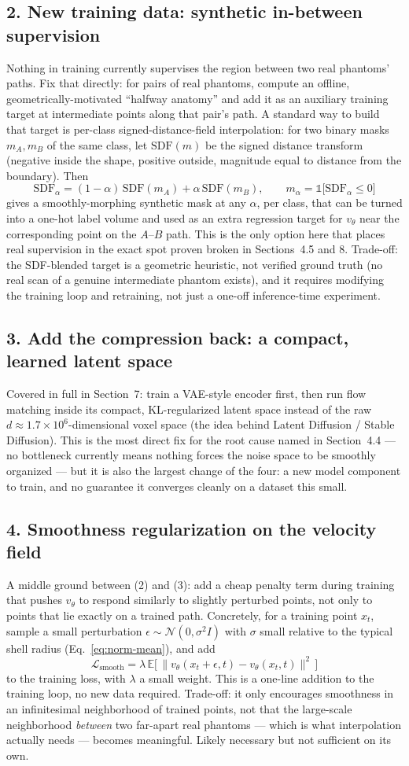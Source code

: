 \documentclass[11pt]{article}
\newcommand{\hsub}[1]{\subsection*{#1}}
\begin{document}
\hsub{2. New training data: synthetic in-between supervision}
Nothing in training currently supervises the region between two real phantoms' paths. Fix
that directly: for pairs of real phantoms, compute an offline, geometrically-motivated
``halfway anatomy'' and add it as an auxiliary training target at intermediate points along
that pair's path. A standard way to build that target is per-class signed-distance-field
interpolation: for two binary masks $m_A, m_B$ of the same class, let $\mathrm{SDF}(m)$ be the
signed distance transform (negative inside the shape, positive outside, magnitude equal to
distance from the boundary). Then
\begin{equation}
\mathrm{SDF}_\alpha = (1-\alpha)\,\mathrm{SDF}(m_A) + \alpha\,\mathrm{SDF}(m_B), \qquad
m_\alpha = \mathbb{1}\big[\mathrm{SDF}_\alpha \le 0\big]
\end{equation}
gives a smoothly-morphing synthetic mask at any $\alpha$, per class, that can be turned into a
one-hot label volume and used as an extra regression target for $v_\theta$ near the
corresponding point on the $A$--$B$ path. This is the only option here that places real
supervision in the exact spot proven broken in Sections~4.5 and 8. Trade-off: the SDF-blended
target is a geometric heuristic, not verified ground truth (no real scan of a genuine
intermediate phantom exists), and it requires modifying the training loop and retraining, not
just a one-off inference-time experiment.

\hsub{3. Add the compression back: a compact, learned latent space}
Covered in full in Section~7: train a VAE-style encoder first, then run flow matching inside
its compact, KL-regularized latent space instead of the raw $d\approx1.7\times10^6$-dimensional
voxel space (the idea behind Latent Diffusion / Stable Diffusion). This is the most direct fix
for the root cause named in Section~4.4 --- no bottleneck currently means nothing forces the
noise space to be smoothly organized --- but it is also the largest change of the four: a new
model component to train, and no guarantee it converges cleanly on a dataset this small.

\hsub{4. Smoothness regularization on the velocity field}
A middle ground between (2) and (3): add a cheap penalty term during training that pushes
$v_\theta$ to respond similarly to slightly perturbed points, not only to points that lie
exactly on a trained path. Concretely, for a training point $x_t$, sample a small perturbation
$\epsilon \sim \mathcal{N}(0,\sigma^2 I)$ with $\sigma$ small relative to the typical shell
radius (Eq.~\eqref{eq:norm-mean}), and add
\begin{equation}
\mathcal{L}_{\text{smooth}} = \lambda \,\mathbb{E}\big[\, \|v_\theta(x_t + \epsilon, t) - v_\theta(x_t, t)\|^2 \,\big]
\end{equation}
to the training loss, with $\lambda$ a small weight. This is a one-line addition to the
training loop, no new data required. Trade-off: it only encourages smoothness in an
infinitesimal neighborhood of trained points, not that the large-scale neighborhood
\emph{between} two far-apart real phantoms --- which is what interpolation actually needs ---
becomes meaningful. Likely necessary but not sufficient on its own.
\end{document}
